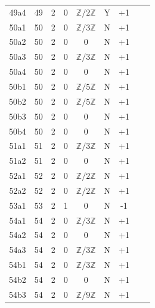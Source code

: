 \begin{table}[htbp]
\begin{tabular}{ccccccccc}
49a4 & 49 & 2 & 0 & $\mathbb{Z}/2\mathbb{Z}$ & Y & +1 &  &  \\
50a1 & 50 & 2 & 0 & $\mathbb{Z}/3\mathbb{Z}$ & N & +1 &  &  \\
50a2 & 50 & 2 & 0 & 0 & N & +1 &  &  \\
50a3 & 50 & 2 & 0 & $\mathbb{Z}/3\mathbb{Z}$ & N & +1 &  &  \\
50a4 & 50 & 2 & 0 & 0 & N & +1 &  &  \\
50b1 & 50 & 2 & 0 & $\mathbb{Z}/5\mathbb{Z}$ & N & +1 &  &  \\
50b2 & 50 & 2 & 0 & $\mathbb{Z}/5\mathbb{Z}$ & N & +1 &  &  \\
50b3 & 50 & 2 & 0 & 0 & N & +1 &  &  \\
50b4 & 50 & 2 & 0 & 0 & N & +1 &  &  \\
51a1 & 51 & 2 & 0 & $\mathbb{Z}/3\mathbb{Z}$ & N & +1 &  &  \\
51a2 & 51 & 2 & 0 & 0 & N & +1 &  &  \\
52a1 & 52 & 2 & 0 & $\mathbb{Z}/2\mathbb{Z}$ & N & +1 &  &  \\
52a2 & 52 & 2 & 0 & $\mathbb{Z}/2\mathbb{Z}$ & N & +1 &  &  \\
53a1 & 53 & 2 & 1 & 0 & N & -1 &  &  \\
54a1 & 54 & 2 & 0 & $\mathbb{Z}/3\mathbb{Z}$ & N & +1 &  &  \\
54a2 & 54 & 2 & 0 & 0 & N & +1 &  &  \\
54a3 & 54 & 2 & 0 & $\mathbb{Z}/3\mathbb{Z}$ & N & +1 &  &  \\
54b1 & 54 & 2 & 0 & $\mathbb{Z}/3\mathbb{Z}$ & N & +1 &  &  \\
54b2 & 54 & 2 & 0 & 0 & N & +1 &  &  \\
54b3 & 54 & 2 & 0 & $\mathbb{Z}/9\mathbb{Z}$ & N & +1 &  &  \\
\bottomrule
\end{tabular}
\end{table}